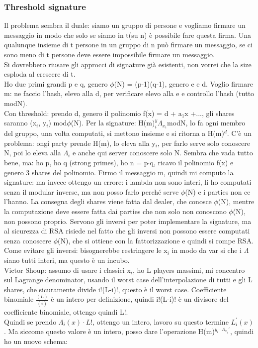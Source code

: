 \documentclass[16px]{article}
\begin{document}
\subsubsection{Threshold signature}
Il problema sembra il duale: siamo un gruppo di persone e vogliamo firmare un messaggio in modo che solo se siamo in t(su n) è possibile fare questa firma. Una qualunque insieme di t persone in un gruppo di n può firmare un messaggio, se ci sono meno di t persone deve essere impossibile firmare un messaggio.\\ Si dovrebbero riusare gli approcci di signature già esistenti, non vorrei che la size esploda al crescere di t.\\ Ho due primi grandi p e q, genero $\phi$(N) = (p-1)(q-1), genero e e d. Voglio firmare m: ne faccio l'hash, elevo alla d, per verificare elevo alla e e controllo l'hash (tutto modN).\\ Con threshold: prendo d, genero il polinomio f(x) = d + a$_1$x +..., gli shares saranno (x$_i$, y$_i$) mod$\phi$(N). Per la signature: H(m)$^y_i\Lambda_{x_i}$modN, lo fa ogni membro del gruppo, una volta computati, si mettono insieme e si ritorna a H(m)$^d$. C'è un problema: ongi party prende H(m), lo eleva alla y$_i$, per farlo serve solo conoscere N, poi lo eleva alla $\Lambda_i$ e anche qui server conoscere solo N. Sembra che vada tutto bene, ma: ho p, ho q (strong primes), ho n = p$\cdot$q, ricavo il polinomio f(x) e genero 3 shares del polinomio. Firmo il messaggio m, quindi mi computo la signature: ma invece ottengo un errore: i lambda non sono interi, li ho computati senza il modular inverse, ma non posso farlo perché serve $\phi$(N) e i parties non ce l'hanno. La consegna degli shares viene fatta dal dealer, che conosce $\phi$(N), mentre la computazione deve essere fatta dai parties che non solo non conoscono $\phi$(N), non possono proprio. Servono gli inversi per poter implementare la signature, ma al sicurezza di RSA risiede nel fatto che gli inversi non possono essere computati senza conoscere $\phi$(N), che si ottiene con la fattorizzazione e quindi si rompe RSA.\\ Come evitare gli inversi: bisognerebbe restringere le x$_i$ in modo da var si che i $\Lambda$ siano tutti interi, ma questo è un incubo. \\ Victor Shoup: assumo di usare i classici x$_i$, ho L players massimi, mi concentro sul Lagrange denominator, usando il worst case dell'interpolazione di tutti e gli L shares, che sicuramente divide i!(L-i)!, questo è il worst case. Coefficiente binomiale $\frac{(L)}{(i)}$ è un intero per definizione, quindi  i!(L-i)! è un divisore del coefficiente binomiale, ottengo quindi L!.\\ Quindi se prendo $\Lambda_i(x)\cdot L!$, ottengo un intero, lavoro su questo termine $L_i^{'}(x)$. Ma siccome questo valore è un intero, posso dare l'operazione H(m)$^{y_i\cdot \Lambda_{x_i}'}$, quindi ho un nuovo schema: 
\end{document}
